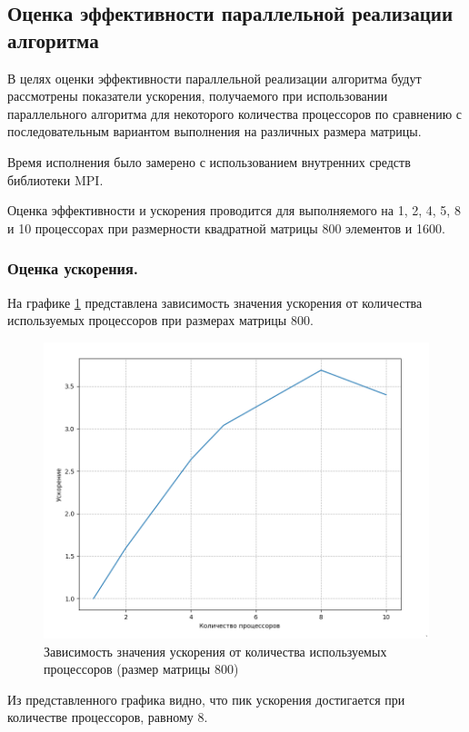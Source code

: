 \documentclass[12pt, a4paper]{article}
\begin{document}
\subsection{Оценка эффективности параллельной реализации алгоритма}
В целях оценки эффективности параллельной реализации алгоритма будут рассмотрены показатели ускорения, получаемого при использовании параллельного алгоритма для некоторого количества процессоров по сравнению с последовательным вариантом выполнения на различных размера матрицы.
	
Время исполнения было замерено с использованием внутренних средств библиотеки MPI.
	
Оценка эффективности и ускорения проводится для выполняемого на 1, 2, 4, 5, 8 и 10 процессорах при размерности квадратной матрицы 800 элементов и 1600.
	
\subsubsection{Оценка ускорения.}
	
На графике \ref{img:first} представлена зависимость значения ускорения от количества используемых процессоров при размерах матрицы 800.
	
\begin{figure}[H]
		\centering
		\includegraphics[width=\textwidth]{img/fst.png}
		\caption{ Зависимость значения ускорения от количества используемых процессоров (размер матрицы 800) }
		\label{img:first}
\end{figure}
	
Из представленного графика видно, что пик ускорения достигается при количестве процессоров, равному 8.
\end{document}
